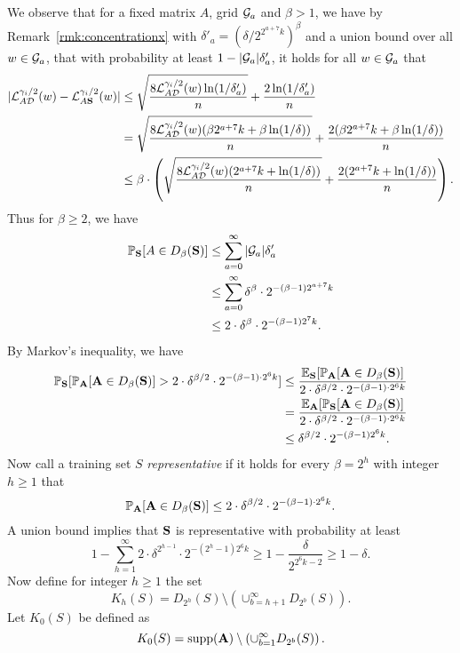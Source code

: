 We observe that for a fixed matrix $A$, grid $\mathcal{G}_a$ and $\beta>1$, we have by Remark~\ref{rmk:concentrationx} with $\delta'_a = (\delta/2^{2^{a+7}k})^{\beta}$
and a union bound over all $w \in \mathcal{G}_a$, that with probability at least $1-|\mathcal{G}_a|\delta'_a$, it holds for all $w \in \mathcal{G}_a$ that
\begin{align*}
    |\mathcal{L}_{A\mathcal{D}}^{\gamma_i/2}(w) - \mathcal{L}_{A\mathbf{S}}^{\gamma_i/2}(w)| &\leq \sqrt{\frac{8\mathcal{L}_{A \mathcal{D}}^{\gamma_i/2}(w)\ln(1/\delta'_a)}{n}} + \frac{2 \ln(1/\delta'_a)}{n} \\
    &= \sqrt{\frac{8\mathcal{L}_{A \mathcal{D}}^{\gamma_i/2}(w)(\beta 2^{a+7}k + \beta \ln(1/\delta))}{n}} + \frac{2 (\beta 2^{a+7}k + \beta \ln(1/\delta))}{n}  \\
    &\leq \beta \cdot \left(\sqrt{\frac{8\mathcal{L}_{A \mathcal{D}}^{\gamma_i/2}(w)(2^{a+7}k + \ln(1/\delta))}{n}} + \frac{2 (2^{a+7}k + \ln(1/\delta))}{n}\right).
\end{align*}
Thus for $\beta \geq 2$, we have
\begin{align*}
\mathbb{P}_{\mathbf{S}}[A \in D_\beta(\mathbf{S})] &\leq \sum_{a=0}^\infty |\mathcal{G}_a| \delta'_a \\
&\leq \sum_{a=0}^\infty \delta^\beta \cdot 2^{-(\beta-1)2^{a+7}k} \\
&\leq 2 \cdot \delta^{\beta} \cdot 2^{-(\beta-1)2^{7}k}.
\end{align*}
By Markov's inequality, we have
\begin{align*}
\mathbb{P}_{\mathbf{S}}[\mathbb{P}_{\mathbf{A}}[\mathbf{A} \in D_\beta(\mathbf{S})] > 2 \cdot \delta^{\beta/2} \cdot 2^{-(\beta-1)\cdot 2^{6}k}] &\leq \frac{\mathbb{E}_{\mathbf{S}}[\mathbb{P}_{\mathbf{A}}[\mathbf{A} \in D_\beta(\mathbf{S})]}{2 \cdot \delta^{\beta/2} \cdot 2^{-(\beta-1)\cdot 2^{6}k}} \\
&= \frac{\mathbb{E}_{\mathbf{A}}[\mathbb{P}_{\mathbf{S}}[\mathbf{A} \in D_\beta(\mathbf{S})]}{2 \cdot \delta^{\beta/2} \cdot 2^{-(\beta-1)\cdot 2^{6}k}}\\
&\leq \delta^{\beta/2} \cdot 2^{-(\beta-1)2^{6}k}.
\end{align*}
Now call a training set $S$ \emph{representative} if it holds for every $\beta=2^h$ with integer $h \geq 1$ that
\[
\mathbb{P}_{\mathbf{A}}[\mathbf{A} \in D_\beta(\mathbf{S})] \leq 2 \cdot \delta^{\beta/2} \cdot 2^{-(\beta-1)\cdot 2^{6}k}.
\]
A union bound implies that $\mathbf{S}$ is representative with probability at least
\[
1-\sum_{h=1}^\infty 2 \cdot \delta^{2^{h-1}} \cdot 2^{-(2^h-1)2^{6}k} \geq 1-\frac{\delta}{2^{2^6 k-2}} \geq 1-\delta.
\]
Now define for integer $h \geq 1$ the set
\[
K_h(S) = D_{2^h}(S) \setminus \left(\cup_{b=h+1}^{\infty} D_{2^b}(S) \right).
\]
Let $K_0(S)$ be defined as
\[
K_0(S) = \operatorname{supp}(\mathbf{A}) \setminus \left(\cup_{b=1}^{\infty} D_{2^b}(S) \right).
\]

